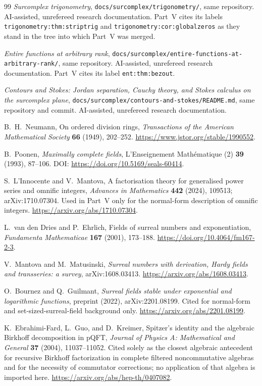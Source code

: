 \documentclass[11pt,letterpaper]{article}
\theoremstyle{definition}
\theoremstyle{remark}
\numberwithin{equation}{section}
\begin{document}
\begin{thebibliography}{99}
\emph{Surcomplex trigonometry}, \texttt{docs/surcomplex/trigonometry/}, same
repository. AI-assisted, unrefereed research documentation. Part~V cites its
labels \nolinkurl{trigonometry:thm:striptrig} and
\nolinkurl{trigonometry:cor:globalzeros} as they stand in the tree into which
Part~V was merged.

\emph{Entire functions at arbitrary rank}, \texttt{docs/surcomplex/entire-functions-at-arbitrary-rank/},
same repository. AI-assisted, unrefereed research documentation. Part~V cites
its label \nolinkurl{ent:thm:bezout}.

\emph{Contours and Stokes: Jordan separation, Cauchy theory, and Stokes
calculus on the surcomplex plane},
\texttt{docs/surcomplex/contours-and-stokes/README.md}, same repository and
commit. AI-assisted, unrefereed research documentation.

B.~H.~Neumann, On ordered division rings,
\emph{Transactions of the American Mathematical Society} \textbf{66} (1949),
202--252.
\url{https://www.jstor.org/stable/1990552}.

B.~Poonen, \emph{Maximally complete fields},
L'Enseignement Math\'ematique (2) \textbf{39} (1993), 87--106.
DOI: \url{https://doi.org/10.5169/seals-60414}.

S.~L'Innocente and V.~Mantova, A factorisation theory for generalised power
series and omnific integers, \emph{Advances in Mathematics} \textbf{442}
(2024), 109513; arXiv:1710.07304. Used in Part~V only for the normal-form
description of omnific integers.
\url{https://arxiv.org/abs/1710.07304}.

L.~van den Dries and P.~Ehrlich, Fields of surreal numbers and exponentiation,
\emph{Fundamenta Mathematicae} \textbf{167} (2001), 173--188.
\url{https://doi.org/10.4064/fm167-2-3}.

V.~Mantova and M.~Matusinski, \emph{Surreal numbers with derivation, Hardy
fields and transseries: a survey}, arXiv:1608.03413.
\url{https://arxiv.org/abs/1608.03413}.

O.~Bournez and Q.~Guilmant, \emph{Surreal fields stable under exponential and
logarithmic functions}, preprint (2022), arXiv:2201.08199. Cited for
normal-form and set-sized-surreal-field background only.
\url{https://arxiv.org/abs/2201.08199}.

K.~Ebrahimi-Fard, L.~Guo, and D.~Kreimer,
Spitzer's identity and the algebraic Birkhoff decomposition in pQFT,
\emph{Journal of Physics A: Mathematical and General} \textbf{37} (2004),
11037--11052. Cited solely as the closest algebraic antecedent for recursive
Birkhoff factorization in complete filtered noncommutative algebras and for the
necessity of commutator corrections; no application of that algebra is imported
here.
\url{https://arxiv.org/abs/hep-th/0407082}.


\end{thebibliography}
\end{document}
